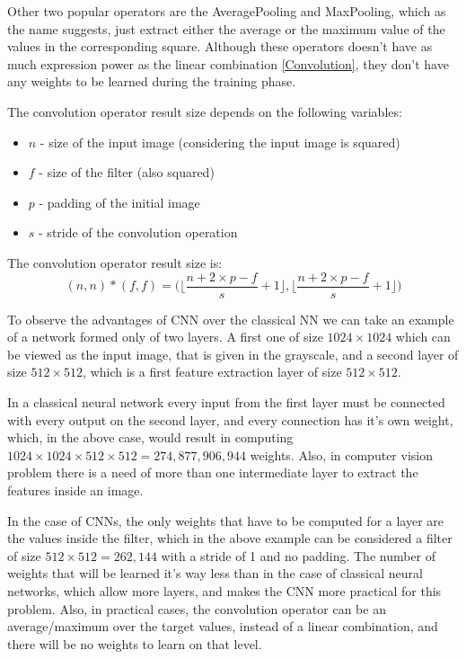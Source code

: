Other two popular operators are the AveragePooling and MaxPooling, which as the name suggests, just extract either the average or the maximum value of the values in the corresponding square. Although these operators doesn't have as much expression power as the linear combination \ref{Convolution}, they don't have any weights to be learned during the training phase.

The convolution operator result size depends on the following variables:
\begin{itemize}
	\item $n$ - size of the input image (considering the input image is squared)
	\item $f$ - size of the filter (also squared)
	\item $p$ - padding of the initial image
	\item $s$ - stride of the convolution operation
\end{itemize}
The convolution operator result size is:
$$ (n, n) * (f, f) = \bigg( \bigg\lfloor \frac{n + 2 \times p - f}{s} + 1 \bigg\rfloor , \bigg\lfloor \frac{n + 2 \times p - f}{s} + 1 \bigg\rfloor \bigg)$$

To observe the advantages of CNN over the classical NN we can take an example of a network formed only of two layers. A first one of size $1024\times1024$ which can be viewed as the input image, that is given in the grayscale, and a second layer of size $512\times512$, which is a first feature extraction layer of size $512\times512$.

In a classical neural network every input from the first layer must be connected with every output on the second layer, and every connection has it's own weight, which, in the above case, would result in computing $1024 \times 1024 \times 512 \times 512 = 274,877,906,944$ weights. Also, in computer vision problem there is a need of more than one intermediate layer to extract the features inside an image.

In the case of CNNs, the only weights that have to be computed for a layer are the values inside the filter, which in the above example can be considered a filter of size $512 \times 512 = 262,144‬$ with a stride of 1 and no padding. The number of weights that will be learned it's way less than in the case of classical neural networks, which allow more layers, and makes the CNN more practical for this problem. Also, in practical cases, the convolution operator can be an average/maximum over the target values, instead of a linear combination, and there will be no weights to learn on that level.

